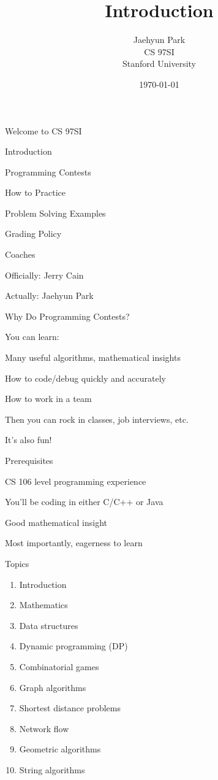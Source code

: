 \documentclass[10pt,onlymath]{beamer}
\title{\large \bfseries Introduction}
\author{Jaehyun Park\\[3ex]
CS 97SI\\
Stanford University}
\date{\today}
\begin{document}
\frame{
\thispagestyle{empty}
\titlepage
}

\begin{frame}{Welcome to CS 97SI}
\BIT
\item Introduction
\item Programming Contests
\item How to Practice
\item Problem Solving Examples
\item Grading Policy
\EIT
\end{frame}

\begin{frame}{Coaches}
\BIT
\item Officially: Jerry Cain
\item Actually: Jaehyun Park
\EIT
\end{frame}

\begin{frame}{Why Do Programming Contests?}
\BIT
\item You can learn:
\BIT
\item Many useful algorithms, mathematical insights
\item How to code/debug quickly and accurately
\item How to work in a team
\EIT
\item Then you can rock in classes, job interviews, etc.
\item It's also fun!
\EIT
\end{frame}

\begin{frame}{Prerequisites}
\BIT
\item CS 106 level programming experience
\BIT
\item You'll be coding in either C/C++ or Java
\EIT
\item Good mathematical insight

\item Most importantly, eagerness to learn
\EIT
\end{frame}

\begin{frame}{Topics}
\begin{enumerate}
\item Introduction
\item Mathematics
\item Data structures
\item Dynamic programming (DP)
\item Combinatorial games
\item Graph algorithms
\item Shortest distance problems
\item Network flow
\item Geometric algorithms
\item String algorithms
\end{enumerate}
\end{frame}
\end{document}
